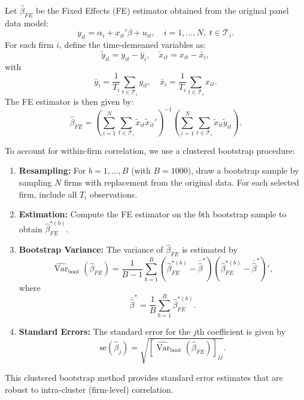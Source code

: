 \documentclass[a4paper,12pt]{article} %
\theoremstyle{nonitalic}
\newenvironment{solution}[1]
  {\renewcommand\theinnercustomsol{#1}\innercustomsol}
  {\endinnercustomsol}
\newcounter{solutionctr}
\renewcommand{\thesolutionctr}{(\alph{solutionctr})}
\newenvironment{autosolution}
  {\stepcounter{solutionctr}\begin{solution}{\thesolutionctr}}
  {\end{solution}}
\begin{document}
\begin{autosolution}
\    

Let \(\hat{\beta}_{FE}\) be the Fixed Effects (FE) estimator obtained from the original panel data model:
\[
y_{it} = \alpha_i + x_{it}'\beta + u_{it}, \quad i=1,\dots,N,\; t\in \mathcal{T}_i.
\]
For each firm \(i\), define the time-demeaned variables as:
\[
\tilde{y}_{it} = y_{it} - \bar{y}_i,\quad \tilde{x}_{it} = x_{it} - \bar{x}_i,
\]
with
\[
\bar{y}_i = \frac{1}{T_i}\sum_{t\in \mathcal{T}_i} y_{it}, \quad \bar{x}_i = \frac{1}{T_i}\sum_{t\in \mathcal{T}_i} x_{it}.
\]
The FE estimator is then given by:
\[
\hat{\beta}_{FE} = \left(\sum_{i=1}^{N}\sum_{t\in \mathcal{T}_i}\tilde{x}_{it}\tilde{x}_{it}'\right)^{-1}\left(\sum_{i=1}^{N}\sum_{t\in \mathcal{T}_i}\tilde{x}_{it}\tilde{y}_{it}\right).
\]

To account for within-firm correlation, we use a clustered bootstrap procedure:
\begin{enumerate}
    \item \textbf{Resampling:} For \(b = 1, \dots, B\) (with \(B = 1000\)), draw a bootstrap sample by sampling \(N\) firms with replacement from the original data. For each selected firm, include all \(T_i\) observations.
    
    \item \textbf{Estimation:} Compute the FE estimator on the \(b\)th bootstrap sample to obtain \(\hat{\beta}_{FE}^{*(b)}\).
    
    \item \textbf{Bootstrap Variance:} The variance of \(\hat{\beta}_{FE}\) is estimated by
    \[
    \widehat{\operatorname{Var}}_{\text{boot}}(\hat{\beta}_{FE}) = \frac{1}{B-1}\sum_{b=1}^{B}\left(\hat{\beta}_{FE}^{*(b)} - \bar{\hat{\beta}}^{*}\right)\left(\hat{\beta}_{FE}^{*(b)} - \bar{\hat{\beta}}^{*}\right)',
    \]
    where
    \[
    \bar{\hat{\beta}}^{*} = \frac{1}{B}\sum_{b=1}^{B} \hat{\beta}_{FE}^{*(b)}.
    \]
    
    \item \textbf{Standard Errors:} The standard error for the \(j\)th coefficient is given by
    \[
    \text{se}(\hat{\beta}_{j}) = \sqrt{\left[\widehat{\operatorname{Var}}_{\text{boot}}(\hat{\beta}_{FE})\right]_{jj}}.
    \]
\end{enumerate}

This clustered bootstrap method provides standard error estimates that are robust to intra-cluster (firm-level) correlation.


\end{autosolution}
\end{document}
